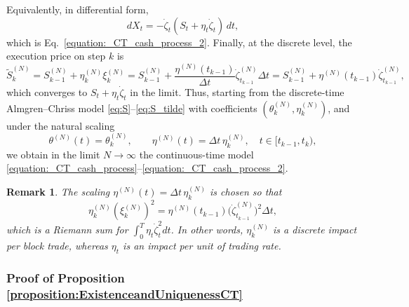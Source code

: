 \documentclass[final,3p,authoryear,12pt]{elsarticle}
\newtheorem{remark}{Remark}
\begin{document}
Equivalently, in differential form,
\[
dX_t = -\dot\zeta_t (S_t + \eta_t \dot\zeta_t)\,dt,
\]
which is Eq.~\eqref{equation:_CT_cash_process_2}.
Finally, at the discrete level, the execution price on step $k$ is
\[
\tilde S^{(N)}_k = S^{(N)}_{k-1} + \eta^{(N)}_k \xi^{(N)}_k
= S^{(N)}_{k-1} + \frac{\eta^{(N)}(t_{k-1})}{\Delta t}
                \dot\zeta^{(N)}_{t_{k-1}}\Delta t
= S^{(N)}_{k-1} + \eta^{(N)}(t_{k-1})\dot\zeta^{(N)}_{t_{k-1}},
\]
which converges to $S_t + \eta_t\dot\zeta_t$ in the limit.
\medskip
Thus, starting from the discrete-time Almgren--Chriss model
\eqref{eq:S}--\eqref{eq:S_tilde} with coefficients
$(\theta^{(N)}_k,\eta^{(N)}_k)$, and under the natural scaling
\[
\theta^{(N)}(t) = \theta^{(N)}_k,
\qquad
\eta^{(N)}(t) = \Delta t\,\eta^{(N)}_k,
\quad
t\in[t_{k-1},t_k),
\]
we obtain in the limit $N\to\infty$ the continuous-time model
\eqref{equation:_CT_cash_process}--\eqref{equation:_CT_cash_process_2}.
\begin{remark}
The scaling $\eta^{(N)}(t) = \Delta t\,\eta^{(N)}_k$ is chosen so that
\[
\eta^{(N)}_k (\xi^{(N)}_k)^2
= \eta^{(N)}(t_{k-1}) \big(\dot\zeta^{(N)}_{t_{k-1}}\big)^2 \Delta t,
\]
which is a Riemann sum for $\int_0^T \eta_t \dot\zeta_t^2 dt$. In other words,
$\eta^{(N)}_k$ is a discrete impact per \emph{block trade}, whereas
$\eta_t$ is an impact per unit of \emph{trading rate}.
\end{remark}


\subsubsection{Proof of Proposition \ref{proposition:ExistenceandUniquenessCT}}
\end{document}
